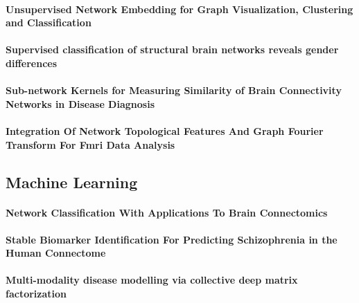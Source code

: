 \paragraph{Unsupervised Network Embedding for Graph Visualization, Clustering and Classification}
\paragraph{Supervised classification of structural brain networks reveals gender differences}
\paragraph{Sub-network Kernels for Measuring Similarity of Brain Connectivity Networks in Disease Diagnosis}
\paragraph{Integration Of Network Topological Features And Graph Fourier Transform For Fmri Data Analysis}

\subsection{Machine Learning}
\paragraph{Network Classification With Applications To Brain Connectomics}
\paragraph{Stable Biomarker Identification For Predicting Schizophrenia in the Human Connectome}

\paragraph{Multi-modality disease modelling via collective deep matrix factorization}